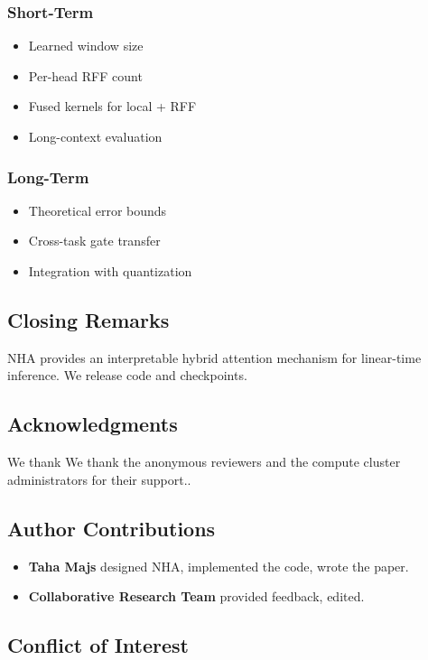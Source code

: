\subsubsection{Short-Term}
\begin{itemize}
\item Learned window size
\item Per-head RFF count
\item Fused kernels for local + RFF
\item Long-context evaluation

\end{itemize}
\subsubsection{Long-Term}
\begin{itemize}
\item Theoretical error bounds
\item Cross-task gate transfer
\item Integration with quantization

\end{itemize}
\subsection{Closing Remarks}

NHA provides an interpretable hybrid attention mechanism for linear-time 
inference. We release code and checkpoints.

\subsection{Acknowledgments}

We thank We thank the anonymous reviewers and the compute cluster administrators for their support..

\subsection{Author Contributions}

\begin{itemize}
\item \textbf{Taha Majs} designed NHA, implemented the code, wrote the paper.
\item \textbf{Collaborative Research Team} provided feedback, edited.

\end{itemize}
\subsection{Conflict of Interest}

